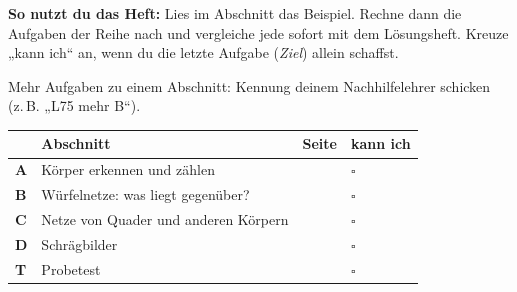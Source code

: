 \documentclass[11pt]{article}
\begin{document}
\par\smallskip
{}\par\medskip
\noindent\textbf{So nutzt du das Heft:} Lies im Abschnitt das Beispiel. Rechne dann die Aufgaben der Reihe nach und vergleiche jede sofort mit dem Lösungsheft. Kreuze „kann ich“ an, wenn du die letzte Aufgabe (\emph{Ziel}) allein schaffst.\par
\noindent Mehr Aufgaben zu einem Abschnitt: Kennung deinem Nachhilfelehrer schicken (z.\,B. „L75 mehr B“).\par\medskip
{\renewcommand{\arraystretch}{1.3}
\noindent\begin{tabular}{|>{\bfseries}p{10mm}|p{112mm}|>{\raggedleft\arraybackslash}p{10mm}|>{\centering\arraybackslash}p{14mm}|}\hline
\rowcolor{black!8} & \textbf{Abschnitt} & \textbf{Seite} & \textbf{kann ich}\\\hline
A & Körper erkennen und zählen & \pageref{s:A} & $\square$\\\hline
B & Würfelnetze: was liegt gegenüber? & \pageref{s:B} & $\square$\\\hline
C & Netze von Quader und anderen Körpern & \pageref{s:C} & $\square$\\\hline
D & Schrägbilder & \pageref{s:D} & $\square$\\\hline
T & Probetest & \pageref{s:T} & $\square$\\\hline
\end{tabular}}\par\bigskip
\end{document}
